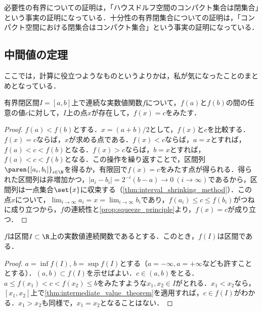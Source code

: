 \documentclass[a4paper,10pt]{ltjsarticle}
\begin{document}
必要性の有界についての証明は，「ハウスドルフ空間のコンパクト集合は閉集合」という事実の証明になっている．十分性の有界閉集合についての証明は，「コンパクト空間における閉集合はコンパクト集合」という事実の証明になっている．

\subsection{中間値の定理}
\label{sec:intermediate_value_theorem}

ここでは，計算に役立つようなものというよりかは，私が気になったことのまとめとなっている．

\begin{MyTheorem}
  有界閉区間\(I=[a, b]\)上で連続な実数値関数\(f\)について，\(f(a)\)と\(f(b)\)の間の任意の値\(c\)に対して，\(I\)上の点\(x\)が存在して，\(f(x) = c\)をみたす．
\end{MyTheorem}
\begin{proof}
  \(f(a) < f(b)\)とする．\(x = (a + b) / 2\)として，\(f(x)\)と\(c\)を比較する．\(f(x) = c\)ならば，\(x\)が求める点である．\(f(x) < c\)ならば，\(a = x\)とすれば，\(f(a) < c < f(b)\)となる．\(f(x) > c\)ならば，\(b = x\)とすれば，\(f(a) < c < f(b)\)となる．この操作を繰り返すことで，区間列\(\paren{[a_i, b_i]}_{i\in\N}\)を得るか，有限回で\(f(x) = c\)をみたす点が得られる．得られた区間列は非増加かつ，\(|a_i - b_i| = 2^{-i}(b-a) \to 0 \ (i \to \infty)\)であるから，区間列は一点集合\(\set{x}\)に収束する（\cref{thm:interval_shrinking_method}）．この点\(x\)について，\(\lim_{i \to \infty} a_i = x = \lim_{i \to \infty} b_i\)であり，\(f(a_i) \le c \le f(b_i)\)がつねに成り立つから，\(f\)の連続性と\cref{prop:squeeze_principle}より，\(f(x) = c\)が成り立つ．
\end{proof}

\begin{MyCorollary}
  \(f\)は区間\(I \subset \R\)上の実数値連続関数であるとする．このとき，\(f(I)\)は区間である．
\end{MyCorollary}
\begin{proof}
  \(a = \inf f(I)\), \(b = \sup f(I)\)とする（\(a = -\infty, a=+\infty\)なども許すこととする）．\((a, b) \subset f(I)\)を示せばよい．\(c \in (a, b)\)をとる．\(a \le f(x_1) < c < f(x_2) \le b\)をみたすような\(x_1, x_2 \in I\)がとれる．\(x_1 < x_2\)なら，\([x_1, x_2]\)上で\cref{thm:intermediate_value_theorem}を適用すれば，\(c \in f(I)\)がわかる．\(x_1 > x_2\)も同様で，\(x_1 = x_2\)となることはない．
\end{proof}
\end{document}
